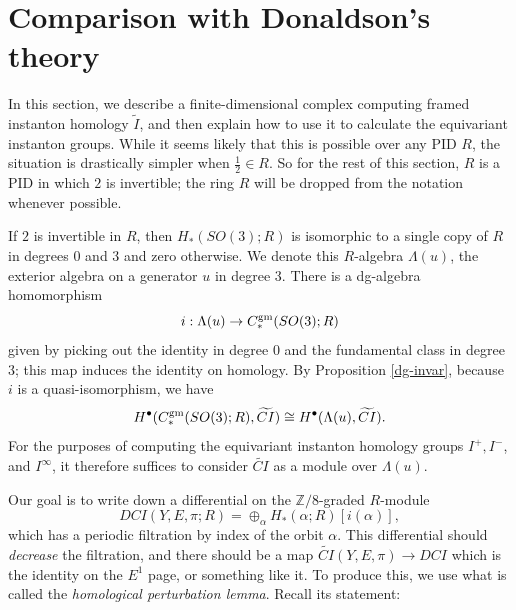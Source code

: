 \documentclass{memo-l}
\theoremstyle{definition}
\theoremstyle{remark}
\numberwithin{section}{chapter}
\numberwithin{equation}{chapter}
\begin{document}
\section{Comparison with Donaldson's theory}\label{secDCI}
In this section, we describe a finite-dimensional complex computing framed instanton homology $\widetilde{I}$, and then explain how to use it to calculate the equivariant instanton groups. While it seems likely that this is possible over any PID $R$, the situation is drastically simpler when $\frac 12 \in R$. So for the rest of this section, $R$ is a PID in which $2$ is invertible; the ring $R$ will be dropped from the notation whenever possible. 

If $2$ is invertible in $R$, then $H_*(SO(3);R)$ is isomorphic to a single copy of $R$ in degrees $0$ and $3$ and zero otherwise. We denote this $R$-algebra $\Lambda(u)$, the exterior algebra on a generator $u$ in degree 3. There is a dg-algebra homomorphism $$i: \Lambda(u) \to C_*^{\textup{gm}}(SO(3);R)$$ given by picking out the identity in degree 0 and the fundamental class in degree 3; this map induces the identity on homology. By Proposition \ref{dg-invar}, because $i$ is a quasi-isomorphism, we have 
$$H^\bullet(C_*^{\textup{gm}}(SO(3);R), \widetilde{CI}) \cong H^\bullet(\Lambda(u), \widetilde{CI}).$$ 
For the purposes of computing the equivariant instanton homology groups $I^+, I^-$, and $I^\infty$, it therefore suffices to consider $\widetilde{CI}$ as a module over $\Lambda(u)$.

Our goal is to write down a differential on the $\mathbb Z/8$-graded $R$-module $$DCI(Y, E,\pi;R) = \oplus_{\alpha} H_{*}(\alpha;R)[i(\alpha)],$$ which has a periodic filtration by index of the orbit $\alpha$. This differential should \textit{decrease} the filtration, and there should be a map $\widetilde{CI}(Y, E,\pi) \to DCI$ which is the identity on the $E^1$ page, or something like it. To produce this, we use what is called the \emph{homological perturbation lemma}. Recall its statement: 
\end{document}
